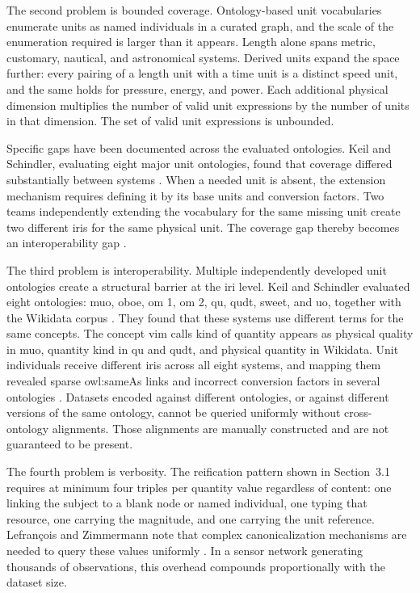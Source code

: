 The second problem is bounded coverage. 
Ontology-based unit vocabularies enumerate units as named individuals in a curated graph, and the scale of the enumeration required is larger than it appears. 
Length alone spans metric, customary, nautical, and astronomical systems. 
Derived units expand the space further: every pairing of a length unit with a time unit is a distinct speed unit, and the same holds for pressure, energy, and power. 
Each additional physical dimension multiplies the number of valid unit expressions by the number of units in that dimension. 
The set of valid unit expressions is unbounded.

Specific gaps have been documented across the evaluated ontologies. 
Keil and Schindler, evaluating eight major unit ontologies, found that 
coverage differed substantially between systems \cite{keil2018comparison}. 
When a needed unit is absent, the extension mechanism requires defining 
it by its base units and conversion factors. 
Two teams independently extending the vocabulary for the same missing 
unit create two different \acp{iri} for the same physical unit. 
The coverage gap thereby becomes an interoperability gap \cite{lefranccois2018unified}.

The third problem is interoperability. 
Multiple independently developed unit ontologies create a structural barrier at the \ac{iri} level. 
Keil and Schindler evaluated eight ontologies: \ac{muo}, \ac{oboe}, \ac{om} 1, \ac{om} 2, \ac{qu}, \ac{qudt}, \ac{sweet}, and \ac{uo}, together with the Wikidata corpus \cite{keil2018comparison}. 
They found that these systems use different terms for the same concepts. 
The concept \ac{vim} calls kind of quantity appears as physical quality in \ac{muo}, quantity kind in \ac{qu} and \ac{qudt}, and physical quantity in Wikidata. 
Unit individuals receive different \acp{iri} across all eight systems, and mapping them revealed sparse \textsf{owl:sameAs} links and incorrect conversion factors in several ontologies \cite{keil2018comparison}. 
Datasets encoded against different ontologies, or against different versions of the same ontology, cannot be queried uniformly without cross-ontology alignments. 
Those alignments are manually constructed and are not guaranteed to be present.

The fourth problem is verbosity. 
The reification pattern shown in Section~3.1 requires at minimum four 
triples per quantity value regardless of content: one linking the subject 
to a blank node or named individual, one typing that resource, one 
carrying the magnitude, and one carrying the unit reference. 
Lefrançois and Zimmermann note that complex canonicalization mechanisms 
are needed to query these values uniformly \cite{lefranccois2018unified}. 
In a sensor network generating thousands of observations, this overhead 
compounds proportionally with the dataset size. 


